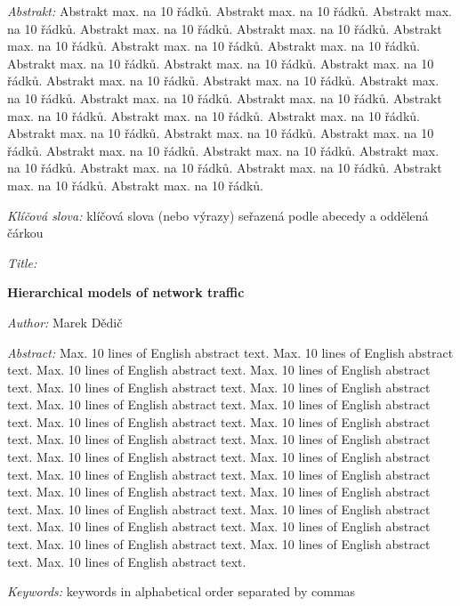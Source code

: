\documentclass[a4paper,11pt]{book}
\begin{document}
\bigskip

\noindent \textit{Abstrakt:} Abstrakt max. na 10 řádků. Abstrakt max. na 10 řádků. Abstrakt max. na 10 řádků. Abstrakt max. na 10 řádků. Abstrakt max. na 10 řádků. Abstrakt max. na 10 řádků. Abstrakt max. na 10 řádků. Abstrakt max. na 10 řádků. Abstrakt max. na 10 řádků. Abstrakt max. na 10 řádků. Abstrakt max. na 10 řádků. Abstrakt max. na 10 řádků. Abstrakt max. na 10 řádků. Abstrakt max. na 10 řádků. Abstrakt max. na 10 řádků. Abstrakt max. na 10 řádků. Abstrakt max. na 10 řádků. Abstrakt max. na 10 řádků. Abstrakt max. na 10 řádků. Abstrakt max. na 10 řádků. Abstrakt max. na 10 řádků. Abstrakt max. na 10 řádků. Abstrakt max. na 10 řádků. Abstrakt max. na 10 řádků. Abstrakt max. na 10 řádků. Abstrakt max. na 10 řádků. Abstrakt max. na 10 řádků. Abstrakt max. na 10 řádků. Abstrakt max. na 10 řádků. 

\bigskip

\noindent \textit{Klíčová slova:} klíčová slova (nebo výrazy) seřazená
podle abecedy a oddělená čárkou

\vfill

\begin{english}
	\begin{onehalfspace}
		\noindent \textit{Title:}

		\noindent \textbf{Hierarchical models of network traffic}
	\end{onehalfspace}

	\bigskip

	\noindent \textit{Author:} Marek Dědič

	\bigskip

	\noindent \textit{Abstract:} Max. 10 lines of English abstract text. Max. 10 lines of English abstract text. Max. 10 lines of English abstract text. Max. 10 lines of English abstract text. Max. 10 lines of English abstract text. Max. 10 lines of English abstract text. Max. 10 lines of English abstract text. Max. 10 lines of English abstract text. Max. 10 lines of English abstract text. Max. 10 lines of English abstract text. Max. 10 lines of English abstract text. Max. 10 lines of English abstract text. Max. 10 lines of English abstract text. Max. 10 lines of English abstract text. Max. 10 lines of English abstract text. Max. 10 lines of English abstract text. Max. 10 lines of English abstract text. Max. 10 lines of English abstract text. Max. 10 lines of English abstract text. Max. 10 lines of English abstract text. Max. 10 lines of English abstract text. Max. 10 lines of English abstract text. Max. 10 lines of English abstract text. Max. 10 lines of English abstract text. Max. 10 lines of English abstract text.

	\bigskip

	\noindent \textit{Keywords:} keywords in alphabetical order separated
	by commas

\end{english}
\end{document}
